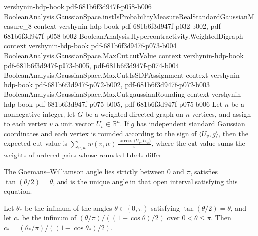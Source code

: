 \begin{theorem}
  {vershynin-hdp-book}
  {pdf-681b6f3d947f-p058-b006}
\proofstep
  {BooleanAnalysis.GaussianSpace.instIsProbabilityMeasureRealStandardGaussianMeasure_8}
  {context}
  {vershynin-hdp-book}
  {pdf-681b6f3d947f-p032-b002,
    pdf-681b6f3d947f-p058-b002}
\proofstep
  {BooleanAnalysis.Hypercontractivity.WeightedDigraph}
  {context}
  {vershynin-hdp-book}
  {pdf-681b6f3d947f-p073-b004}
\proofstep
  {BooleanAnalysis.GaussianSpace.MaxCut.cutValue}
  {context}
  {vershynin-hdp-book}
  {pdf-681b6f3d947f-p073-b005,
    pdf-681b6f3d947f-p074-b004}
\proofstep
  {BooleanAnalysis.GaussianSpace.MaxCut.IsSDPAssignment}
  {context}
  {vershynin-hdp-book}
  {pdf-681b6f3d947f-p072-b002,
    pdf-681b6f3d947f-p072-b003}
\proofstep
  {BooleanAnalysis.GaussianSpace.MaxCut.gaussianRounding}
  {context}
  {vershynin-hdp-book}
  {pdf-681b6f3d947f-p075-b005,
    pdf-681b6f3d947f-p075-b006}
Let $n$ be a nonnegative integer, let $G$ be a weighted directed graph on $n$ vertices,
and assign to each vertex $v$ a unit vector $U_v\in\mathbb R^n$. If $g$ has independent
standard Gaussian coordinates and each vertex is rounded according to the sign of
$\langle U_v,g\rangle$, then the expected cut value is
$\displaystyle\sum_{v,w}w(v,w)\,\frac{\arccos\langle U_v,U_w\rangle}{\pi}$, where the
cut value sums the weights of ordered pairs whose rounded labels differ.
\end{theorem}

\begin{theorem}
\label{BooleanAnalysis.GaussianSpace.MaxCut.gwAngle_spec}
\leanok
{}
The Goemans–Williamson angle lies strictly between $0$ and $\pi$, satisfies
$\tan(\theta/2)=\theta$, and is the unique angle in that open interval satisfying
this equation.
\end{theorem}

\begin{theorem}
\label{BooleanAnalysis.GaussianSpace.MaxCut.gwConstant_eq}
\leanok
{}
Let $\theta_*$ be the infimum of the angles $\theta\in(0,\pi)$ satisfying
$\tan(\theta/2)=\theta$, and let $c_*$ be the infimum of
$(\theta/\pi)/((1-\cos\theta)/2)$ over $0<\theta\leq\pi$. Then
$c_*=(\theta_*/\pi)/((1-\cos\theta_*)/2)$.
\end{theorem}

